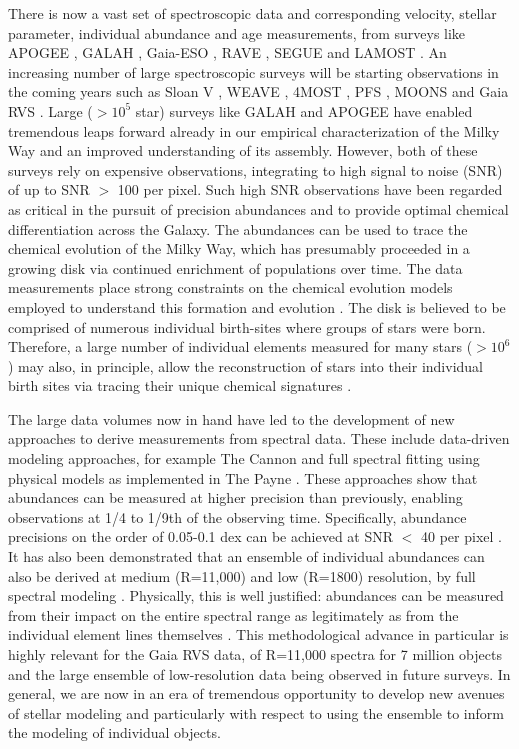 \documentclass[a4paper,fleqn,usenatbib]{mnras}
\begin{document}
There is now a vast set of spectroscopic data and corresponding velocity, stellar parameter, individual abundance and age measurements, from surveys like APOGEE \citep{Majewski2017}, GALAH \citep{deSilva2015}, Gaia-ESO \citep{Gilmore2012}, RAVE \citep{Steinmetz2006}, SEGUE \citep{Yanny2009} and LAMOST \citep{Newberg2012}. An increasing number of large spectroscopic surveys will be starting observations in the coming years such as Sloan V \citep{Kollmeier2017}, WEAVE \citep{Bonifacio2016}, 4MOST \citep{deJong2016}, PFS \citep{PFS2016}, MOONS \citep{C2014} and Gaia RVS \citep{Gaia2016}. Large ($> 10^5$ star) surveys like GALAH and APOGEE have enabled tremendous leaps forward already in our empirical characterization of the Milky Way and an improved understanding of its assembly. However, both of these surveys rely on expensive observations, integrating to high signal to noise (SNR) of up to SNR $>$ 100 per pixel. Such high SNR observations have been regarded as critical in the pursuit of precision abundances and to provide optimal chemical differentiation across the Galaxy. The abundances can be used to trace the chemical evolution of the Milky Way, which has presumably proceeded in a growing disk via continued enrichment of populations over time. The data measurements place strong constraints on the chemical evolution models employed to understand this formation and evolution \citep[e.g.][]{Clarke2019,Minchev2013,Minchev2014}. The disk is believed to be comprised of numerous individual birth-sites where groups of stars were born. Therefore, a large number of individual elements measured for many stars ($> 10^6$) may also, in principle,  allow the reconstruction of stars into their individual birth sites via tracing their unique chemical signatures \citep[e.g.][]{BH2010}. 

The large data volumes now in hand have led to the development of new approaches to derive measurements from spectral data. These include data-driven modeling approaches, for example The Cannon \citep{Ness2015} and full spectral fitting using physical models as implemented in The Payne \citep{Ting2018}. These approaches show that abundances can be measured at higher precision than previously, enabling observations at 1/4 to 1/9th of the observing time. Specifically, abundance precisions on the order of 0.05-0.1 dex can be achieved at SNR $<$ 40 per pixel \citep{Ness2018, Ting2018, Ho2017b}. It has also been demonstrated that an ensemble of individual abundances can also be derived at medium (R=11,000) and low (R=1800) resolution, by full spectral modeling \citep[e.g.][and Wheeler et al., in prep]{Casey2016, Ting2017}. Physically, this is well justified: abundances can be measured from their impact on the entire spectral range as legitimately as from the individual element lines themselves  \citep[e.g.][]{Ting2018}. This methodological advance in particular is highly relevant for the Gaia RVS data, of R=11,000 spectra for 7 million objects and the large ensemble of low-resolution data being observed in future surveys. In general, we are now in an era of tremendous opportunity to develop new avenues of stellar modeling and particularly with respect to using the ensemble to inform the modeling of individual objects. 
\end{document}
